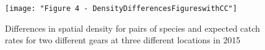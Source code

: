 \documentclass{nature}
\begin{document}
\begin{figure}
\begin{center}
	\texttt{[image: "Figure 4 - DensityDifferencesFigureswithCC"]}
	\label{fig:4}
	\caption{Differences in spatial density for pairs of species and
		expected catch rates for two different gears at three different
	locations in 2015}
\end{center}
\end{figure}
\end{document}
